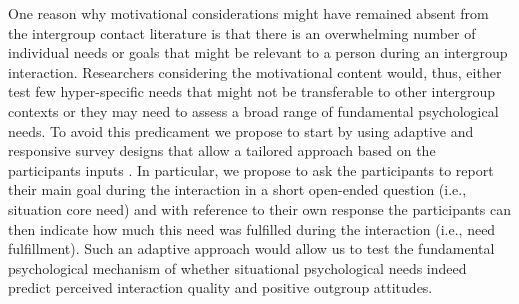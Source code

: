 \documentclass[man, 12pt, a4paper, mask]{apa7}
\theoremstyle{break}
\theoremstyle{plain}
\begin{document}
One reason why motivational considerations might have remained absent from the intergroup contact literature is that there is an overwhelming number of individual needs or goals that might be relevant to a person during an intergroup interaction. Researchers considering the motivational content would, thus, either test few hyper-specific needs that might not be transferable to other intergroup contexts or they may need to assess a broad range of fundamental psychological needs. To avoid this predicament we propose to start by using adaptive and responsive survey designs that allow a tailored approach based on the participants inputs \citep[e.g.,][]{Tourangeau2017}. In particular, we propose to ask the participants to report their main goal during the interaction in a short open-ended question (i.e., situation core need) and with reference to their own response the participants can then indicate how much this need was fulfilled during the interaction (i.e., need fulfillment). Such an adaptive approach would allow us to test the fundamental psychological mechanism of whether situational psychological needs indeed predict perceived interaction quality and positive outgroup attitudes. 
\end{document}
